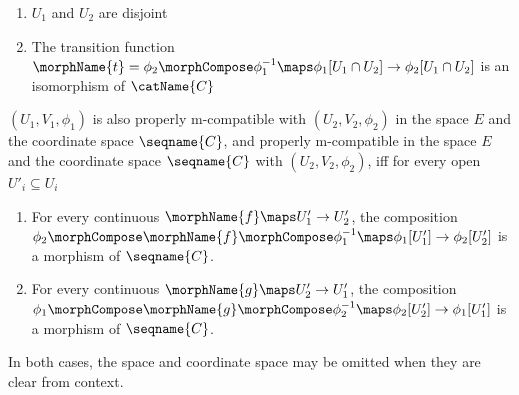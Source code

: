 \documentclass{article}
\begin{document}
\begin{definition}[M-compatibility]
\begin{enumerate}
\item $U_1$ and $U_2$ are disjoint
\item The transition function
$
  \morphName{t}=\phi_2 \morphCompose \phi^{-1}_1
  \maps \phi_1[U_1 \cap U_2] \to \phi_2[U_1 \cap U_2]
$
is an isomorphism of $\catName{C}$
\end{enumerate}

$(U_1, V_1, \phi_1)$ is also properly m-compatible with
\nobreaks
  {{
    $(U_2, V_2, \phi_2)$
  }}
in the space $E$ and the coordinate space $\seqname{C}$, and properly
m-compatible in the space $E$ and the coordinate space $\seqname{C}$ with
\nobreaks
  {{
    $(U_2, V_2, \phi_2)$,
  }}
iff
for every open $U'_i \subseteq U_i$

\begin{enumerate}
\item
For every continuous $\morphName{f} \maps U'_1 \to U'_2$,
the composition
$
  \phi_2 \morphCompose \morphName{f} \morphCompose \phi^{-1}_1
  \maps \phi_1[U'_1] \to \phi_2[U'_2]
$
is a morphism of $\seqname{C}$.

\item
For every continuous $\morphName{g} \maps U'_2 \to U'_1$,
the composition
$
  \phi_1 \morphCompose \morphName{g} \morphCompose \phi^{-1}_2
  \maps \phi_2[U'_2] \to \phi_1[U'_1]
$
is a morphism of $\seqname{C}$.
\end{enumerate}

In both cases, the space and coordinate space may be omitted when they
are clear from context.
\end{definition}
\end{document}
